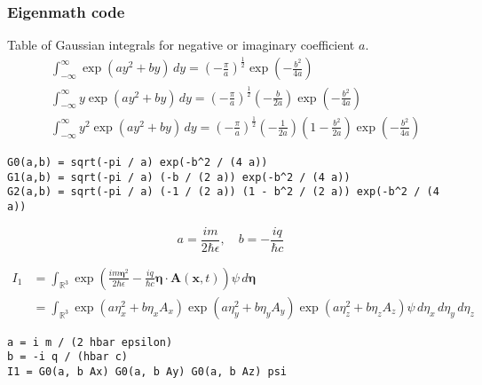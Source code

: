 \subsubsection*{Eigenmath code}

Table of Gaussian integrals for negative or imaginary coefficient $a$.
\begin{align*}
&\int_{-\infty}^\infty\exp(ay^2+by)\,dy
=\left(-\frac{\pi}{a}\right)^\frac{1}{2}
\exp\left(-\frac{b^2}{4a}\right)
\\
&\int_{-\infty}^\infty y\exp(ay^2+by)\,dy
=\left(-\frac{\pi}{a}\right)^\frac{1}{2}
\left(-\frac{b}{2a}\right)
\exp\left(-\frac{b^2}{4a}\right)
\\
&\int_{-\infty}^\infty y^2\exp(ay^2+by)\,dy
=\left(-\frac{\pi}{a}\right)^\frac{1}{2}
\left(-\frac{1}{2a}\right)
\left(1-\frac{b^2}{2a}\right)
\exp\left(-\frac{b^2}{4a}\right)
\end{align*}

{\footnotesize\begin{verbatim}
G0(a,b) = sqrt(-pi / a) exp(-b^2 / (4 a))
G1(a,b) = sqrt(-pi / a) (-b / (2 a)) exp(-b^2 / (4 a))
G2(a,b) = sqrt(-pi / a) (-1 / (2 a)) (1 - b^2 / (2 a)) exp(-b^2 / (4 a))
\end{verbatim}}

\begin{equation*}
a=\frac{im}{2\hbar\epsilon},\quad
b=-\frac{iq}{\hbar c}
\end{equation*}

\begin{align*}
I_1&=\int_{\mathbb R^3}
\exp\left(\frac{im\boldsymbol\eta^2}{2\hbar\epsilon}
-\frac{iq}{\hbar c}\boldsymbol\eta\cdot\mathbf A(\mathbf x,t)\right)
\psi\,d\boldsymbol\eta
\\
&=\int_{\mathbb R^3}
\exp\left(a\eta_x^2+b\eta_xA_x\right)
\exp\left(a\eta_y^2+b\eta_yA_y\right)
\exp\left(a\eta_z^2+b\eta_zA_z\right)
\psi\,d\eta_x\,d\eta_y\,d\eta_z
\end{align*}

{\footnotesize\begin{verbatim}
a = i m / (2 hbar epsilon)
b = -i q / (hbar c)
I1 = G0(a, b Ax) G0(a, b Ay) G0(a, b Az) psi
\end{verbatim}}

